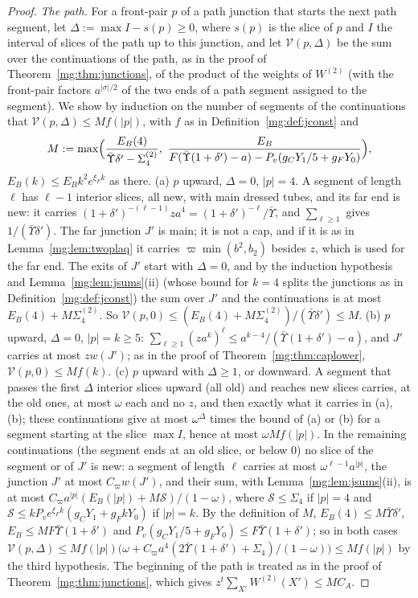 \documentclass[11pt,a4paper]{article}
\theoremstyle{definition}
\theoremstyle{remark}
\begin{document}
\begin{proof}
\emph{The path.} For a front-pair $p$ of a path junction that starts the next path segment, let $\Delta:=\max I-s(p)\ge0$, where $s(p)$ is the slice of $p$ and $I$
the interval of slices of the path up to this junction, and let $\mathcal V(p,\Delta)$ be the sum over the continuations of the path, as in the proof of
Theorem~\ref{mg:thm:junctions}, of the product of the weights of $W^{(2)}$ (with the front-pair factors $a^{|\sigma|/2}$ of the two ends of a path segment
assigned to the segment). We show by induction on the number of segments of the continuations that $\mathcal V(p,\Delta)\le Mf(|p|)$, with $f$ as in
Definition~\ref{mg:def:jconst} and
\[
M:=\max\Bigl(\frac{E_B(4)}{\bar\Upsilon\delta'-\Sigma^{(2)}_4},\ \frac{E_B}{F(\bar\Upsilon(1+\delta')-a)-P_v(g_CY_1/5+g_FY_0)}\Bigr),
\]
$E_B(k)\le E_Bk^2e^{\xi_Fk}$ as there. (a) $p$ upward, $\Delta=0$, $|p|=4$. A segment of length $\ell$ has $\ell-1$ interior slices, all new, with main dressed tubes, and
its far end is new: it carries $(1+\delta')^{-(\ell-1)}za^4=(1+\delta')^{-\ell}/\bar\Upsilon$, and $\sum_{\ell\ge1}$ gives $1/(\bar\Upsilon\delta')$. The far junction $J'$ is
main; it is not a cap, and if it is as in Lemma~\ref{mg:lem:twoplaq} it carries $\varpi\min(b^2,b_2)$ besides $z$, which is used for the far end. The exits of
$J'$ start with $\Delta=0$, and by the induction hypothesis and Lemma~\ref{mg:lem:jsums}(ii) (whose bound for $k=4$ splits the junctions as in
Definition~\ref{mg:def:jconst}) the sum over $J'$ and the continuations is at most $E_B(4)+M\Sigma^{(2)}_4$. So
$\mathcal V(p,0)\le(E_B(4)+M\Sigma^{(2)}_4)/(\bar\Upsilon\delta')\le M$. (b) $p$ upward, $\Delta=0$, $|p|=k\ge5$: $\sum_{\ell\ge1}(za^k)^\ell\le a^{k-4}/(\bar\Upsilon(1+\delta')-a)$, and
$J'$ carries at most $zw(J')$; as in the proof of Theorem~\ref{mg:thm:caplower}, $\mathcal V(p,0)\le Mf(k)$. (c) $p$ upward with $\Delta\ge1$, or downward. A
segment that passes the first $\Delta$ interior slices upward (all old) and reaches new slices carries, at the old ones, at most $\omega$ each and no $z$, and
then exactly what it carries in (a), (b); these continuations give at most $\omega^\Delta$ times the bound of (a) or (b) for a segment starting at the slice $\max I$, hence at most
$\omega Mf(|p|)$. In the remaining continuations (the segment ends at an old
slice, or below $0$) no slice of the segment or of $J'$ is new: a segment of length $\ell$ carries at most $\omega^{\ell-1}a^{|p|}$, the junction $J'$ at most
$C_\varpi w(J')$, and their sum, with Lemma~\ref{mg:lem:jsums}(ii), is at most $C_\varpi a^{|p|}(E_B(|p|)+M\mathcal S)/(1-\omega)$, where $\mathcal S\le\Sigma_4$ if
$|p|=4$ and $\mathcal S\le kP_ve^{\xi_Fk}(g_CY_1+g_FkY_0)$ if $|p|=k$. By the definition of $M$, $E_B(4)\le M\bar\Upsilon\delta'$, $E_B\le MF\bar\Upsilon(1+\delta')$ and
$P_v(g_CY_1/5+g_FY_0)\le F\bar\Upsilon(1+\delta')$; so in both cases $\mathcal V(p,\Delta)\le Mf(|p|)\bigl(\omega+C_\varpi a^4(2\bar\Upsilon(1+\delta')+\Sigma_4)/(1-\omega)\bigr)\le Mf(|p|)$ by
the third hypothesis. The beginning of the path is treated as in the proof of Theorem~\ref{mg:thm:junctions}, which gives $z^t\sum_{X'}W^{(2)}(X')\le MC_A$.


\end{proof}
\end{document}
